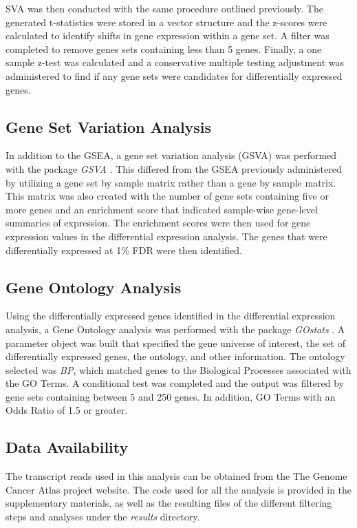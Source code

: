 \documentclass[9pt,twocolumn,twoside]{gsajnl}
\begin{document}
SVA was then conducted with the same procedure outlined previously. The generated t-statistics were stored in a vector structure and the z-scores were calculated to identify shifts in gene expression within a gene set. A filter was completed to remove genes sets containing less than 5 genes. Finally, a one sample z-test was calculated and a conservative multiple testing adjustment was administered to find if any gene sets were candidates for differentially expressed genes.

\subsection{Gene Set Variation Analysis}

In addition to the GSEA, a gene set variation analysis (GSVA) was performed with the package \textit{GSVA} \citep{GSVA}. This differed from the GSEA previously administered by utilizing a gene set by sample matrix rather than a gene by sample matrix. This matrix was also created with the number of gene sets containing five or more genes and an enrichment score that indicated sample-wise gene-level summaries of expression. The enrichment scores were then used for gene expression values in the differential expression analysis. The genes that were differentially expressed at 1\% FDR were then identified. 
 
\subsection{Gene Ontology Analysis}

Using the differentially expressed genes identified in the differential expression analysis, a Gene Ontology analysis was performed with the package \textit{GOstats} \citep{gostats}. A parameter object was built that specified the gene universe of interest, the set of differentially expressed genes, the ontology, and other information. The ontology selected was \textit{BP}, which matched genes to the Biological Processes associated with the GO Terms. A conditional test was completed and the output was filtered by gene sets containing between 5 and 250 genes. In addition, GO Terms with an Odds Ratio of 1.5 or greater.

\subsection{Data Availability}

The transcript reads used in this analysis can be obtained from the The Genome Cancer Atlas project website. The code used for all the analysis is provided in the supplementary materials, as well as the resulting files of the different filtering steps and analyses under the \textit{results} directory.
\end{document}
